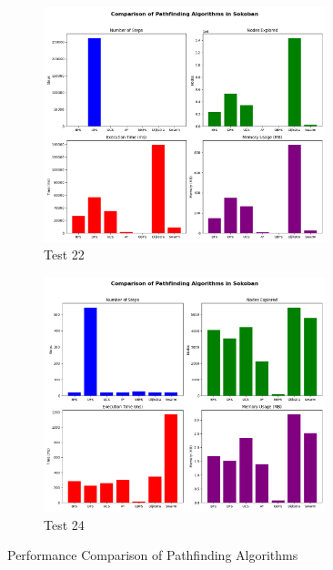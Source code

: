 \begin{figure}[H]
\begin{subfigure}{0.46\textwidth}
        \includegraphics[width=0.9\textwidth]{imgs/test22.png}
        \caption{Test 22}
    \end{subfigure}
    \hfill
    \begin{subfigure}{0.46\textwidth}
        \centering
        \includegraphics[width=0.9\textwidth]{imgs/test24.png}
        \caption{Test 24}
    \end{subfigure}
    \caption{Performance Comparison of Pathfinding Algorithms}
    \label{fig:comparison}
\end{figure}


